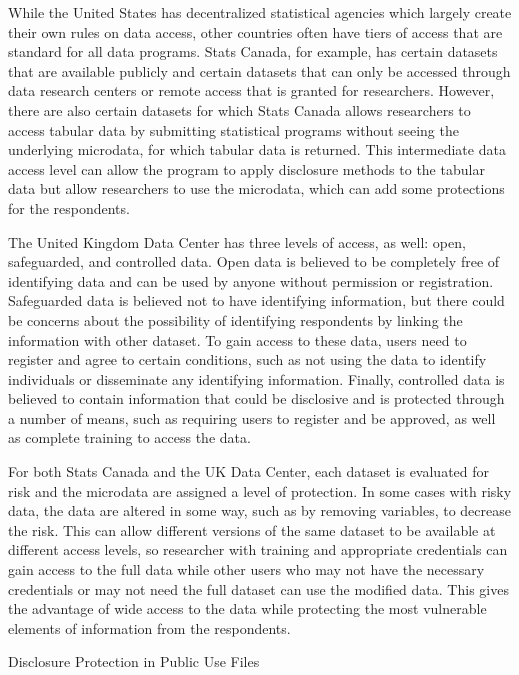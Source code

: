 \documentclass[12pt]{article}
\begin{document}
While the United States has decentralized statistical agencies which largely create their own rules on data access, other countries often have tiers of access that are standard for all data programs. Stats Canada, for example, has certain datasets that are available publicly and certain datasets that can only be accessed through data research centers or remote access that is granted for researchers. However, there are also certain datasets for which Stats Canada allows researchers to access tabular data by submitting statistical programs without seeing the underlying microdata, for which tabular data is returned. This intermediate data access level can allow the program to apply disclosure methods to the tabular data but allow researchers to use the microdata, which can add some protections for the respondents.

The United Kingdom Data Center has three levels of access, as well: open, safeguarded, and controlled data. Open data is believed to be completely free of identifying data and can be used by anyone without permission or registration. Safeguarded data is believed not to have identifying information, but there could be concerns about the possibility of identifying respondents by linking the information with other dataset. To gain access to these data, users need to register and agree to certain conditions, such as not using the data to identify individuals or disseminate any identifying information. Finally, controlled data is believed to contain information that could be disclosive and is protected through a number of means, such as requiring users to register and be approved, as well as complete training to access the data.

For both Stats Canada and the UK Data Center, each dataset is evaluated for risk and the microdata are assigned a level of protection. In some cases with risky data, the data are altered in some way, such as by removing variables, to decrease the risk. This can allow different versions of the same dataset to be available at different access levels, so researcher with training and appropriate credentials can gain access to the full data while other users who may not have the necessary credentials or may not need the full dataset can use the modified data. This gives the advantage of wide access to the data while protecting the most vulnerable elements of information from the respondents.

Disclosure Protection in Public Use Files
\end{document}

